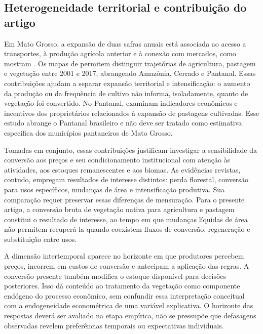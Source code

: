 \subsection{Heterogeneidade territorial e contribuição do artigo}

Em Mato Grosso, a expansão de duas safras anuais está associada ao acesso a transportes, à produção agrícola anterior e à conexão com mercados, como mostram . Os mapas de  permitem distinguir trajetórias de agricultura, pastagem e vegetação entre 2001 e 2017, abrangendo Amazônia, Cerrado e Pantanal. Essas contribuições ajudam a separar expansão territorial e intensificação: o aumento da produção ou da frequência de cultivo não informa, isoladamente, quanto de vegetação foi convertido. No Pantanal,  examinam indicadores econômicos e incentivos dos proprietários relacionados à expansão de pastagens cultivadas. Esse estudo abrange o Pantanal brasileiro e não deve ser tratado como estimativa específica dos municípios pantaneiros de Mato Grosso.

Tomadas em conjunto, essas contribuições justificam investigar a sensibilidade da conversão aos preços e seu condicionamento institucional com atenção às atividades, aos estoques remanescentes e aos biomas. As evidências revistas, contudo, empregam resultados de interesse distintos: perda florestal, conversão para usos específicos, mudanças de área e intensificação produtiva. Sua comparação requer preservar essas diferenças de mensuração. Para o presente artigo, a conversão bruta de vegetação nativa para agricultura e pastagem constitui o resultado de interesse, ao tempo em que mudanças líquidas de área não permitem recuperá-la quando coexistem fluxos de conversão, regeneração e substituição entre usos.

A dimensão intertemporal aparece no horizonte em que produtores percebem preços, incorrem em custos de conversão e antecipam a aplicação das regras. A conversão presente também modifica o estoque disponível para decisões posteriores. Isso dá conteúdo ao tratamento da vegetação como componente endógeno do processo econômico, sem confundir essa interpretação conceitual com a endogeneidade econométrica de uma variável explicativa. O horizonte das respostas deverá ser avaliado na etapa empírica, não se pressupõe que defasagens observadas revelem preferências temporais ou expectativas individuais.

